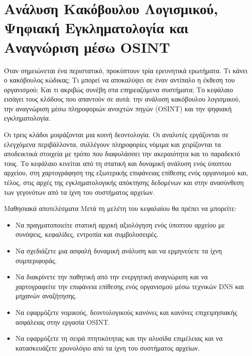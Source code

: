 \chapter{Ανάλυση Κακόβουλου Λογισμικού, Ψηφιακή Εγκληματολογία και Αναγνώριση μέσω OSINT}\label{ch:12}

Όταν σημειώνεται ένα περιστατικό, προκύπτουν τρία ερευνητικά ερωτήματα. Τι κάνει ο κακόβουλος κώδικας; Τι μπορεί να αποκαλύψει σε έναν αντίπαλο η έκθεση του οργανισμού; Και τι ακριβώς συνέβη στα επηρεαζόμενα συστήματα; Το κεφάλαιο εισάγει τους κλάδους που απαντούν σε αυτά: την ανάλυση κακόβουλου λογισμικού, την αναγνώριση μέσω πληροφοριών ανοιχτών πηγών (OSINT) και την ψηφιακή εγκληματολογία.

Οι τρεις κλάδοι μοιράζονται μια κοινή δεοντολογία. Οι αναλυτές εργάζονται σε ελεγχόμενα περιβάλλοντα, συλλέγουν πληροφορίες νόμιμα και χειρίζονται τα αποδεικτικά στοιχεία με τρόπο που διαφυλάσσει την ακεραιότητα και το παραδεκτό τους. Το κεφάλαιο κινείται από τη στατική και δυναμική ανάλυση ενός ύποπτου αρχείου, στη χαρτογράφηση της εξωτερικής επιφάνειας επίθεσης ενός οργανισμού και, τέλος, στις αρχές της εγκληματολογικής απόκτησης δεδομένων και στην ανασύνθεση των γεγονότων από τα ίχνη του συστήματος αρχείων.

\begin{outcomesbox}{Μαθησιακά αποτελέσματα}
Μετά τη μελέτη του κεφαλαίου θα πρέπει να μπορείτε:
\begin{itemize}
  \item Να πραγματοποιείτε στατική αρχική αξιολόγηση ενός ύποπτου αρχείου με συνόψεις, κεφαλίδες, εντροπία και συμβολοσειρές.
  \item Να σχεδιάζετε μια ασφαλή δυναμική ανάλυση και να ερμηνεύετε τα ίχνη συμπεριφοράς.
  \item Να διακρίνετε την παθητική από την ενεργητική αναγνώριση και να χαρτογραφείτε την επιφάνεια επίθεσης ενός οργανισμού μέσω τεχνικών DNS και μηχανών αναζήτησης.
  \item Να εφαρμόζετε νομικούς, δεοντολογικούς κανόνες και κανόνες επιχειρησιακής ασφάλειας στην εργασία OSINT.
  \item Να εφαρμόζετε τη σειρά πτητικότητας και την αλυσίδα επιμέλειας και να κατασκευάζετε χρονολόγιο από τα ίχνη του συστήματος αρχείων.
\end{itemize}
\end{outcomesbox}

